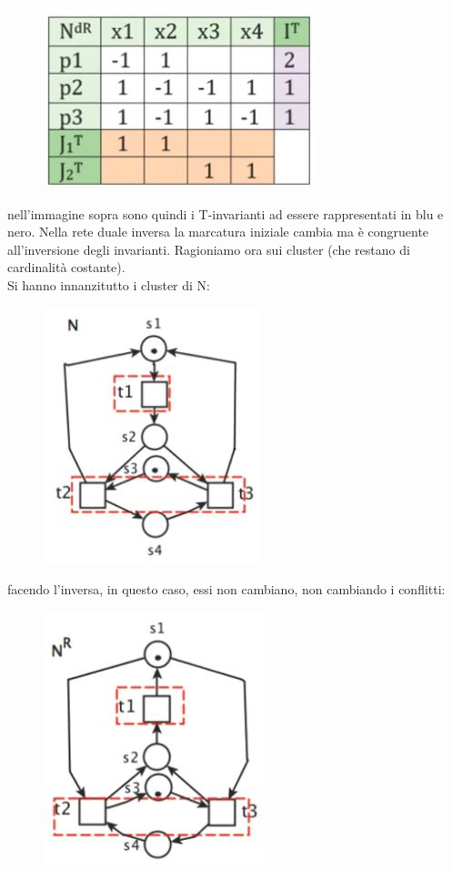 \documentclass[a4paper,12pt, oneside]{book}
\begin{document}
\begin{esempio}
\begin{figure}[H]
    \includegraphics[scale = 0.5]{img/dr14.jpg}
  \end{figure}
  nell'immagine sopra  sono quindi i T-invarianti ad essere rappresentati in blu
  e nero. Nella rete duale inversa la marcatura iniziale cambia ma è congruente
  all'inversione degli invarianti.
  \newpage
  Ragioniamo ora sui cluster (che restano di cardinalità costante).\\
  Si hanno innanzitutto i cluster di N:
  \begin{figure}[H]
    \centering
    \includegraphics[scale = 0.5]{img/dr15.jpg}
  \end{figure}
  facendo l'inversa, in questo caso, essi non cambiano, non cambiando i
  conflitti: 
  \begin{figure}[H]
    \centering
    \includegraphics[scale = 0.5]{img/dr16.jpg}

\end{figure}
\end{esempio}
\end{document}
